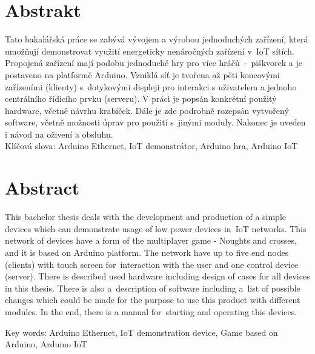 \section*{Abstrakt}
Tato bakalářská práce se zabývá vývojem a výrobou jednoduchých zařízení, která umožňují demonstrovat využití energeticky nenáročných zařízení v~IoT sítích. Propojená zařízení mají podobu jednoduché hry pro více hráčů~-~piškvorek a je postaveno na platformě Arduino. Vzniklá síť je tvořena až pěti koncovými zařízeními (klienty) s~dotykovými displeji pro interakci s uživatelem a jednoho centrálního řídicího prvku (serveru). V práci je popsán konkrétní použitý hardware, včetně návrhu krabiček. Dále je zde podrobně rozepsán vytvořený software, včetně možnosti úprav pro použití s~jinými moduly. Nakonec je uveden i návod na oživení a obsluhu.\\

\vspace{.5cm}
\noindent
Klíčová slova: Arduino Ethernet, IoT demonstrátor, Arduino hra, Arduino IoT



\section*{Abstract}
{
This bachelor thesis deals with the development and production of a simple devices which can demonstrate usage of low power devices in~IoT networks. This network of devices have a form of the multiplayer game - Noughts and crosses, and it is based on Arduino platform. The network have up to five end nodes (clients) with touch screen for~interaction with the user and one control device (server).  There is described used hardware including design of cases for all devices in this thesis. There is also a~description of software including a~list of possible changes which could be made for the purpose to use this product with different modules. In the end, there is a manual for~starting and operating this devices.

\vspace{.5cm}
\noindent
Key words: Arduino Ethernet, IoT demonstration device, Game based on Arduino, Arduino IoT
}
